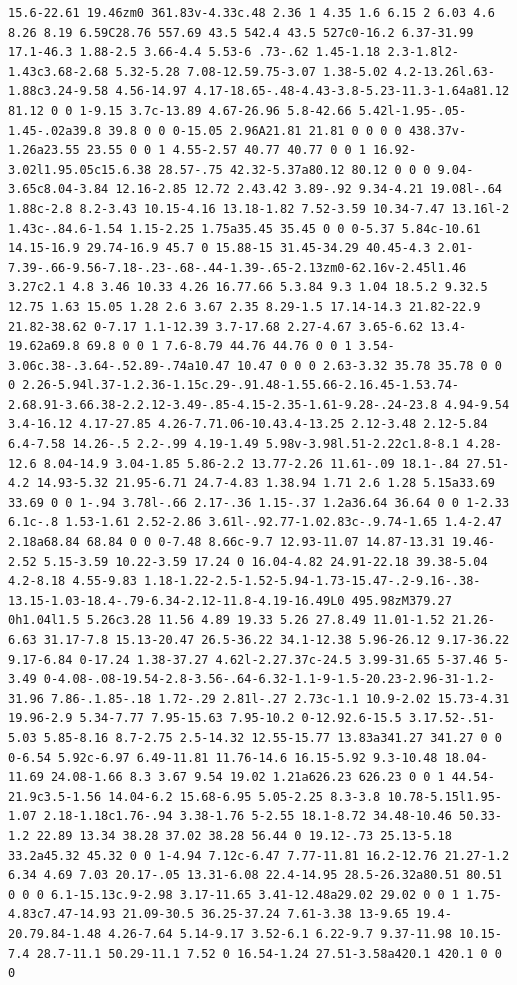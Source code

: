 \documentclass[11pt]{article}
\begin{document}
\begin{enumerate}
\begin{verbatim}
15.6-22.61 19.46zm0 361.83v-4.33c.48 2.36 1 4.35 1.6 6.15 2 6.03 4.6 8.26 8.19 6.59C28.76 557.69 43.5 542.4 43.5 527c0-16.2 6.37-31.99 17.1-46.3 1.88-2.5 3.66-4.4 5.53-6 .73-.62 1.45-1.18 2.3-1.8l2-1.43c3.68-2.68 5.32-5.28 7.08-12.59.75-3.07 1.38-5.02 4.2-13.26l.63-1.88c3.24-9.58 4.56-14.97 4.17-18.65-.48-4.43-3.8-5.23-11.3-1.64a81.12 81.12 0 0 1-9.15 3.7c-13.89 4.67-26.96 5.8-42.66 5.42l-1.95-.05-1.45-.02a39.8 39.8 0 0 0-15.05 2.96A21.81 21.81 0 0 0 0 438.37v-1.26a23.55 23.55 0 0 1 4.55-2.57 40.77 40.77 0 0 1 16.92-3.02l1.95.05c15.6.38 28.57-.75 42.32-5.37a80.12 80.12 0 0 0 9.04-3.65c8.04-3.84 12.16-2.85 12.72 2.43.42 3.89-.92 9.34-4.21 19.08l-.64 1.88c-2.8 8.2-3.43 10.15-4.16 13.18-1.82 7.52-3.59 10.34-7.47 13.16l-2 1.43c-.84.6-1.54 1.15-2.25 1.75a35.45 35.45 0 0 0-5.37 5.84c-10.61 14.15-16.9 29.74-16.9 45.7 0 15.88-15 31.45-34.29 40.45-4.3 2.01-7.39-.66-9.56-7.18-.23-.68-.44-1.39-.65-2.13zm0-62.16v-2.45l1.46 3.27c2.1 4.8 3.46 10.33 4.26 16.77.66 5.3.84 9.3 1.04 18.5.2 9.32.5 12.75 1.63 15.05 1.28 2.6 3.67 2.35 8.29-1.5 17.14-14.3 21.82-22.9 21.82-38.62 0-7.17 1.1-12.39 3.7-17.68 2.27-4.67 3.65-6.62 13.4-19.62a69.8 69.8 0 0 1 7.6-8.79 44.76 44.76 0 0 1 3.54-3.06c.38-.3.64-.52.89-.74a10.47 10.47 0 0 0 2.63-3.32 35.78 35.78 0 0 0 2.26-5.94l.37-1.2.36-1.15c.29-.91.48-1.55.66-2.16.45-1.53.74-2.68.91-3.66.38-2.2.12-3.49-.85-4.15-2.35-1.61-9.28-.24-23.8 4.94-9.54 3.4-16.12 4.17-27.85 4.26-7.71.06-10.43.4-13.25 2.12-3.48 2.12-5.84 6.4-7.58 14.26-.5 2.2-.99 4.19-1.49 5.98v-3.98l.51-2.22c1.8-8.1 4.28-12.6 8.04-14.9 3.04-1.85 5.86-2.2 13.77-2.26 11.61-.09 18.1-.84 27.51-4.2 14.93-5.32 21.95-6.71 24.7-4.83 1.38.94 1.71 2.6 1.28 5.15a33.69 33.69 0 0 1-.94 3.78l-.66 2.17-.36 1.15-.37 1.2a36.64 36.64 0 0 1-2.33 6.1c-.8 1.53-1.61 2.52-2.86 3.61l-.92.77-1.02.83c-.9.74-1.65 1.4-2.47 2.18a68.84 68.84 0 0 0-7.48 8.66c-9.7 12.93-11.07 14.87-13.31 19.46-2.52 5.15-3.59 10.22-3.59 17.24 0 16.04-4.82 24.91-22.18 39.38-5.04 4.2-8.18 4.55-9.83 1.18-1.22-2.5-1.52-5.94-1.73-15.47-.2-9.16-.38-13.15-1.03-18.4-.79-6.34-2.12-11.8-4.19-16.49L0 495.98zM379.27 0h1.04l1.5 5.26c3.28 11.56 4.89 19.33 5.26 27.8.49 11.01-1.52 21.26-6.63 31.17-7.8 15.13-20.47 26.5-36.22 34.1-12.38 5.96-26.12 9.17-36.22 9.17-6.84 0-17.24 1.38-37.27 4.62l-2.27.37c-24.5 3.99-31.65 5-37.46 5-3.49 0-4.08-.08-19.54-2.8-3.56-.64-6.32-1.1-9-1.5-20.23-2.96-31-1.2-31.96 7.86-.1.85-.18 1.72-.29 2.81l-.27 2.73c-1.1 10.9-2.02 15.73-4.31 19.96-2.9 5.34-7.77 7.95-15.63 7.95-10.2 0-12.92.6-15.5 3.17.52-.51-5.03 5.85-8.16 8.7-2.75 2.5-14.32 12.55-15.77 13.83a341.27 341.27 0 0 0-6.54 5.92c-6.97 6.49-11.81 11.76-14.6 16.15-5.92 9.3-10.48 18.04-11.69 24.08-1.66 8.3 3.67 9.54 19.02 1.21a626.23 626.23 0 0 1 44.54-21.9c3.5-1.56 14.04-6.2 15.68-6.95 5.05-2.25 8.3-3.8 10.78-5.15l1.95-1.07 2.18-1.18c1.76-.94 3.38-1.76 5-2.55 18.1-8.72 34.48-10.46 50.33-1.2 22.89 13.34 38.28 37.02 38.28 56.44 0 19.12-.73 25.13-5.18 33.2a45.32 45.32 0 0 1-4.94 7.12c-6.47 7.77-11.81 16.2-12.76 21.27-1.2 6.34 4.69 7.03 20.17-.05 13.31-6.08 22.4-14.95 28.5-26.32a80.51 80.51 0 0 0 6.1-15.13c.9-2.98 3.17-11.65 3.41-12.48a29.02 29.02 0 0 1 1.75-4.83c7.47-14.93 21.09-30.5 36.25-37.24 7.61-3.38 13-9.65 19.4-20.79.84-1.48 4.26-7.64 5.14-9.17 3.52-6.1 6.22-9.7 9.37-11.98 10.15-7.4 28.7-11.1 50.29-11.1 7.52 0 16.54-1.24 27.51-3.58a420.1 420.1 0 0 0 
\end{verbatim}
\end{enumerate}
\end{document}
